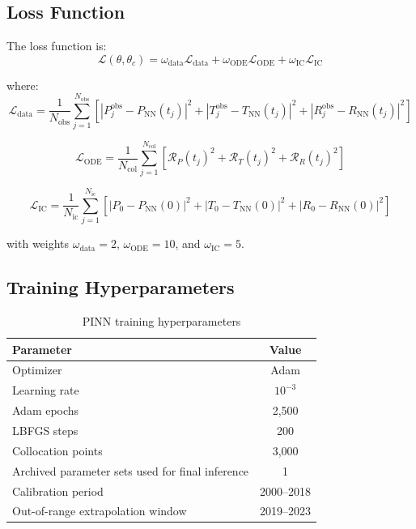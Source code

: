 \documentclass[12pt,a4paper]{article}
\begin{document}
	\subsection{Loss Function}
	
	The loss function is:
	\begin{equation}
\mathcal{L}(\theta, \theta_c) = \omega_{\text{data}} \mathcal{L}_{\text{data}} + \omega_{\text{ODE}} \mathcal{L}_{\text{ODE}} + \omega_{\text{IC}} \mathcal{L}_{\text{IC}}
	\end{equation}
	
	where:
	\begin{equation}
\mathcal{L}_{\text{data}} = \frac{1}{N_{\text{obs}}} \sum_{j=1}^{N_{\text{obs}}} \left[ |P_j^{\text{obs}} - P_{\text{NN}}(t_j)|^2 + |T_j^{\text{obs}} - T_{\text{NN}}(t_j)|^2 + |R_j^{\text{obs}} - R_{\text{NN}}(t_j)|^2 \right]
	\end{equation}
	
	\begin{equation}
\mathcal{L}_{\text{ODE}} = \frac{1}{N_{\text{col}}} \sum_{j=1}^{N_{\text{col}}} \left[ \mathcal{R}_P(t_j)^2 + \mathcal{R}_T(t_j)^2 + \mathcal{R}_R(t_j)^2 \right]
	\end{equation}
	
	\begin{equation}
		\mathcal{L}_{\text{IC}} = \frac{1}{N_{\text{ic}}} \sum_{j=1}^{N_{\text{ic}}} \left[ |P_0 - P_{\text{NN}}(0)|^2 + |T_0 - T_{\text{NN}}(0)|^2 + |R_0 - R_{\text{NN}}(0)|^2 \right]
	\end{equation}
	
with weights $\omega_{\text{data}} = 2$, $\omega_{\text{ODE}} = 10$, and
$\omega_{\text{IC}} = 5$.
	
	\subsection{Training Hyperparameters}
	
	\begin{table}[H]
		\centering
		\caption{PINN training hyperparameters}
		\label{tab:hyperparams}
		\begin{tabular}{lc}
			\toprule
			Parameter & Value \\
			\midrule
			Optimizer & Adam \\
			Learning rate & $10^{-3}$ \\
			Adam epochs & 2,500 \\
			LBFGS steps & 200 \\
			Collocation points & 3,000 \\
			Archived parameter sets used for final inference & 1 \\
			Calibration period & 2000--2018 \\
			Out-of-range extrapolation window & 2019--2023 \\
			\bottomrule
		\end{tabular}
	\end{table}
\end{document}
